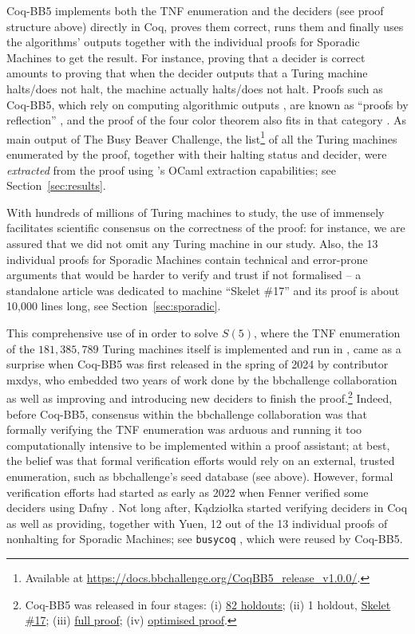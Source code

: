 \documentclass[a4paper,british]{article}
\theoremstyle{definition} %
\numberwithin{equation}{section}
\theoremstyle{definition} %
\newcommand{\BBtheFifthTNF}{181{,}385{,}789}
\newcommand{\CoqBB}{Coq-BB5\xspace}
\begin{document}
\CoqBB implements both the TNF enumeration and the deciders (see proof structure above) directly in Coq, proves them correct, runs them and finally uses the algorithms' outputs together with the individual proofs for Sporadic Machines to get the result. For instance, proving that a decider is correct amounts to proving that when the decider outputs that a Turing machine halts/does not halt, the machine actually halts/does not halt. Proofs such as \CoqBB, which rely on computing algorithmic outputs \cite{vmcompute,nativecompute}, are known as ``proofs by reflection'' \cite{boutin1997using}, and the \Coq proof of the four color theorem also fits in that category \cite{gonthier2010introduction}. As main output of The Busy Beaver Challenge, the list\footnote{Available at \url{https://docs.bbchallenge.org/CoqBB5_release_v1.0.0/}.} of all the Turing machines enumerated by the \Coq proof, together with their halting status and decider, were \textit{extracted} from the proof using \Coq's OCaml extraction capabilities; see Section~\ref{sec:results}.

With hundreds of millions of Turing machines to study, the use of \Coq immensely facilitates scientific consensus on the correctness of the proof: for instance, we are assured that we did not omit any Turing machine in our study. Also, the 13 individual proofs for Sporadic Machines contain technical and error-prone arguments that would be harder to verify and trust if not formalised -- \eg a standalone article was dedicated to machine ``Skelet \#17'' \cite{xu2024skelet17fifthbusy} and its \Coq proof is about 10,000 lines long, see Section~\ref{sec:sporadic}.



This comprehensive use of \Coq in order to solve $S(5)$, where the TNF enumeration of the $\BBtheFifthTNF$ Turing machines itself is implemented and run in \Coq, came as a surprise when \CoqBB was first released in the spring of 2024 by contributor mxdys, who embedded two years of work done by the bbchallenge collaboration as well as improving and introducing new deciders to finish the proof.\footnote{\CoqBB was released in four stages: (i) \href{https://discuss.bbchallenge.org/t/proving-bb-5-in-coq/225}{82 holdouts}; (ii) 1 holdout, \href{https://bbchallenge.org/1RB---_0LC1RE_0LD1LC_1RA1LB_0RB0RA}{Skelet \#17}; (iii) \href{https://discuss.bbchallenge.org/t/july-2nd-2024-we-have-proved-bb-5-47-176-870/237}{full proof}; (iv) \href{https://github.com/ccz181078/Coq-BB5}{optimised proof}.} Indeed, before \CoqBB, consensus within the bbchallenge collaboration  was that formally verifying the TNF enumeration was arduous and running it too computationally intensive to be implemented within a proof assistant; at best, the belief was that formal verification efforts would rely on an external, trusted enumeration, such as bbchallenge's seed database (see above). However, formal verification efforts had started as early as 2022 when Fenner verified some deciders using Dafny \cite{dafny_fenner, Dafny}. Not long after, Kądziołka started verifying deciders in Coq as well as providing, together with Yuen, 12 out of the 13 individual proofs of nonhalting for Sporadic Machines; see  \texttt{busycoq} \cite{busycoq}, which were reused by \CoqBB.
\end{document}
